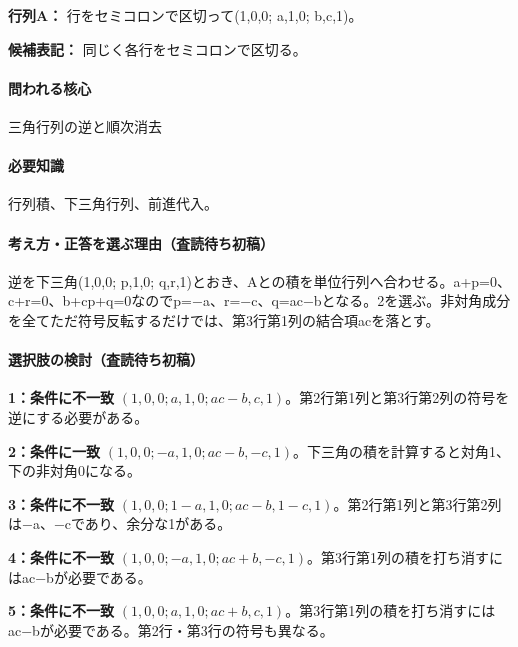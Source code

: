 \noindent\textbf{行列A：} 行をセミコロンで区切って(1,0,0; a,1,0; b,c,1)。\par

\noindent\textbf{候補表記：} 同じく各行をセミコロンで区切る。\par

\paragraph{問われる核心} 三角行列の逆と順次消去

\paragraph{必要知識} 行列積、下三角行列、前進代入。

\paragraph{考え方・正答を選ぶ理由（査読待ち初稿）} 逆を下三角(1,0,0; p,1,0; q,r,1)とおき、Aとの積を単位行列へ合わせる。a+p=\allowbreak{}0、c+r=\allowbreak{}0、b+cp+q=\allowbreak{}0なのでp=−a、r=−c、q=\allowbreak{}ac−bとなる。2を選ぶ。非対角成分を全てただ符号反転するだけでは、第3行第1列の結合項acを落とす。

\paragraph{選択肢の検討（査読待ち初稿）}\mbox{}\par

\noindent\textbf{1：条件に不一致} \((1,0,0;a,1,0;ac-b,c,1)\)。第2行第1列と第3行第2列の符号を逆にする必要がある。\par

\noindent\textbf{2：条件に一致} \((1,0,0;-a,1,0;ac-b,-c,1)\)。下三角の積を計算すると対角1、下の非対角0になる。\par

\noindent\textbf{3：条件に不一致} \((1,0,0;1-a,1,0;ac-b,1-c,1)\)。第2行第1列と第3行第2列は−a、−cであり、余分な1がある。\par

\noindent\textbf{4：条件に不一致} \((1,0,0;-a,1,0;ac+b,-c,1)\)。第3行第1列の積を打ち消すにはac−bが必要である。\par

\noindent\textbf{5：条件に不一致} \((1,0,0;a,1,0;ac+b,c,1)\)。第3行第1列の積を打ち消すにはac−bが必要である。第2行・第3行の符号も異なる。\par


